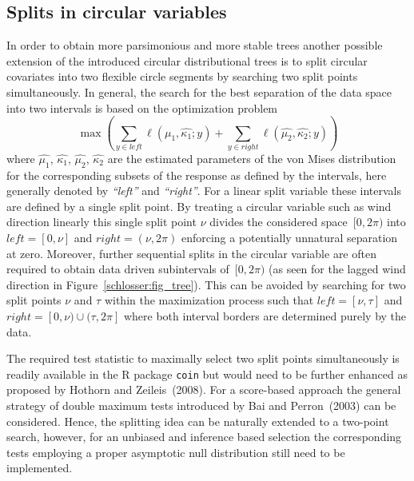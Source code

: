 \documentclass[twoside]{report}
\begin{document}
\subsection{Splits in circular variables}
In order to obtain more parsimonious and more stable trees another possible extension of the 
introduced circular distributional trees is to split circular covariates into two 
flexible circle segments by searching two split points simultaneously.
In general, the search for the best separation of the data space into two intervals is based 
on the optimization problem
\begin{equation}
\max \left(\sum_{y \in \mathit{left}} \ell(\hat{\mu_1}, \hat{\kappa_1}; y) + \sum_{y \in \mathit{right}} \ell(\hat{\mu_2}, \hat{\kappa_2}; y)\right)
\end{equation}
where $\hat{\mu_1}$, $\hat{\kappa_1}$, $\hat{\mu_2}$, $\hat{\kappa_2}$ are the estimated parameters
of the von Mises distribution for the corresponding subsets of the response as defined by the
intervals, here generally denoted by \textit{``left''} and \textit{``right''}.
For a linear split variable these intervals are defined by a single split point.
By treating a circular variable such as wind direction linearly
this single split point $\nu$ divides the considered space~$[0,2\pi)$ into
$\mathit{left}=[0,\nu]$ and $\mathit{right}=(\nu,2\pi)$ enforcing a potentially unnatural 
separation at zero. 
Moreover, further sequential splits in the circular variable are often required to obtain 
data driven subintervals of~$[0,2\pi)$ (as seen for the lagged wind direction in Figure~\ref{schlosser:fig_tree}).
This can be avoided by searching for two split points $\nu$ and $\tau$ within the maximization
process such that $\mathit{left}=[\nu,\tau]$ and $\mathit{right}=[0,\nu) \cup (\tau,2\pi]$
where both interval borders are determined purely by the data.

The required test statistic to maximally select two split points simultaneously is readily 
available in the \textsf{R} package \texttt{coin} but would need to be further enhanced as proposed 
by Hothorn and Zeileis~(2008). For a score-based approach the general strategy of double maximum tests introduced by Bai and Perron~(2003) can be considered. 
Hence, the splitting idea can be naturally extended to a two-point search, however, for 
an unbiased and inference based selection the corresponding tests employing a proper
asymptotic null distribution still need to be implemented.

\bigskip
\end{document}
